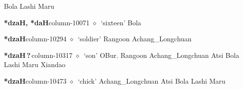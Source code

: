 \hspace{1ex}
         Bola 
\hspace{1ex}
         Lashi 
\hspace{1ex}
         Maru 
  \item {\footnotesize \textbf{*dzaH, *daH}}{\tiny column-10071}
         $\diamond$~`sixteen'
         Bola 
  \item {\footnotesize \textbf{*dzaH}}{\tiny column-10294}
         $\diamond$~`soldier'
         Rangoon 
\hspace{1ex}
         Achang\_Longchuan 
  \item {\footnotesize \textbf{*dzaH\,?\,}}{\tiny column-10317}
         $\diamond$~`son'
         OBur. 
\hspace{1ex}
         Rangoon 
\hspace{1ex}
         Achang\_Longchuan 
\hspace{1ex}
         Atsi 
\hspace{1ex}
         Bola 
\hspace{1ex}
         Lashi 
\hspace{1ex}
         Maru 
\hspace{1ex}
         Xiandao 
  \item {\footnotesize \textbf{*dzaH}}{\tiny column-10473}
         $\diamond$~`chick'
         Achang\_Longchuan 
\hspace{1ex}
         Atsi 
\hspace{1ex}
         Bola 
\hspace{1ex}
         Lashi 
\hspace{1ex}
         Maru 
\hspace{1ex}

